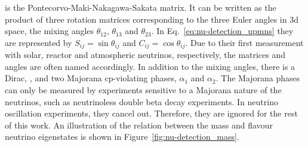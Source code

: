 is the Pontecorvo-Maki-Nakagawa-Sakata matrix.
It can be written as the product of three rotation matrices corresponding to the three Euler angles in \gls{3d} space, the mixing angles $\theta_{12}$, $\theta_{13}$ and $\theta_{23}$.
In Eq.~\eqref{eq:nu-detection_upmns} they are represented by $S_{ij} = \sin{\theta_{ij}}$ and $C_{ij} = \cos{\theta_{ij}}$.
Due to their first measurement with solar, reactor and atmospheric neutrinos, respectively, the matrices and angles are often named accordingly.
In addition to the mixing angles, there is a Dirac, \dcp, and two Majorana \gls{cp}-violating phases, $\alpha_1$ and $\alpha_2$.
The Majorana phases can only be measured by experiments sensitive to a Majorana nature of the neutrinos, such as neutrinoless double beta decay experiments.
In neutrino oscillation experiments, they cancel out.
Therefore, they are ignored for the rest of this work.
An illustration of the relation between the mass and flavour neutrino eigenstates is shown in Figure~\ref{fig:nu-detection_mass}.

